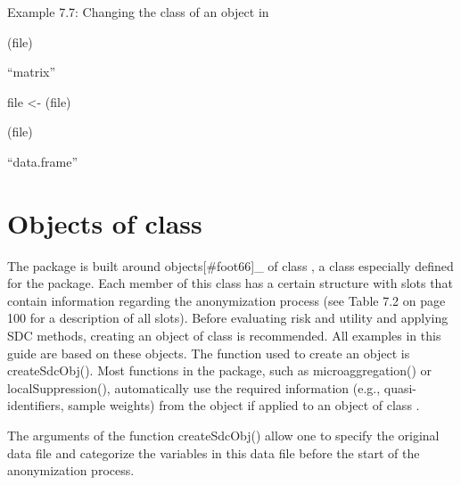 \documentclass[letterpaper,10pt,english]{sphinxmanual}
\begin{document}
Example 7.7: Changing the class of an object in 

\begin{DUlineblock}{0em}
\item[] 
\item[] (file)
\end{DUlineblock}

“matrix”

\begin{DUlineblock}{0em}
\item[] 
\item[] file \textless{}- (file)
\end{DUlineblock}


(file)

“data.frame”


\section{Objects of class }
\label{\detokenize{sdcMicro:objects-of-class-sdcmicroobj}}
The  package is built around objects{[}\#foot66{]}\_ of
class , a class especially defined for the 
package. Each member of this class has a certain structure with slots
that contain information regarding the anonymization process (see Table
7.2 on page 100 for a description of all slots). Before evaluating risk
and utility and applying SDC methods, creating an object of class
 is recommended. All examples in this guide are based on these
objects. The function used to create an  object is
createSdcObj(). Most functions in the  package, such as
microaggregation() or localSuppression(), automatically use the required
information (e.g., quasi-identifiers, sample weights) from the
 object if applied to an object of class .

The arguments of the function createSdcObj() allow one to specify the
original data file and categorize the variables in this data file before
the start of the anonymization process. 
\end{document}

